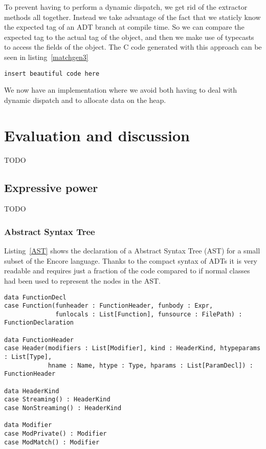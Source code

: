 \documentclass[10pt]{report}
\begin{document}
{\par{To prevent having to perform a dynamic dispatch, we get rid of the extractor methods all together. Instead we take advantage of the fact that we staticly know the expected tag of an ADT branch at compile time. So we can compare the expected tag to the actual tag of the object, and then we make use of typecasts to access the fields of the object. The C code generated with this approach can be seen in listing~\ref{matchgen3}}

\begin{lstlisting}[language=encore,caption={Pattern matching on a List},label=matchgen3]
  insert beautiful code here
\end{lstlisting}
\par{We now have an implementation where we avoid both having to deal with dynamic dispatch and to allocate data on the heap.}
\chapter{Evaluation and discussion}
TODO
\section{Expressive power}
TODO
\subsection{Abstract Syntax Tree}
\par{Listing~\ref{AST} shows the declaration of a Abstract Syntax Tree (AST) for a small subset of the Encore language. Thanks to the compact syntax of ADTs it is very readable and requires just a fraction of the code compared to if normal classes had been used to represent the nodes in the AST.}
\begin{lstlisting}[language=encore,caption={Abstract Syntax Tree with ADTs},label=AST]
data FunctionDecl
case Function(funheader : FunctionHeader, funbody : Expr,
              funlocals : List[Function], funsource : FilePath) : FunctionDeclaration

data FunctionHeader
case Header(modifiers : List[Modifier], kind : HeaderKind, htypeparams : List[Type],
            hname : Name, htype : Type, hparams : List[ParamDecl]) : FunctionHeader

data HeaderKind
case Streaming() : HeaderKind
case NonStreaming() : HeaderKind

data Modifier
case ModPrivate() : Modifier
case ModMatch() : Modifier


\end{lstlisting}}
\end{document}
